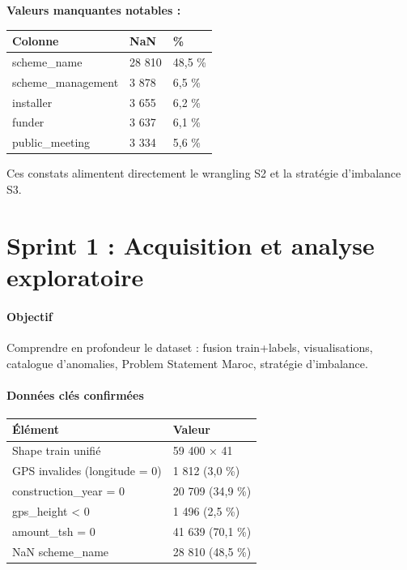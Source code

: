 \documentclass[11pt,a4paper]{report}
\begin{document}
\textbf{Valeurs manquantes notables :}



\begin{longtable}{@{}lll@{}}
\toprule
Colonne & NaN & \% \\
\midrule
scheme\_name & 28 810 & 48,5 \% \\
scheme\_management & 3 878 & 6,5 \% \\
installer & 3 655 & 6,2 \% \\
funder & 3 637 & 6,1 \% \\
public\_meeting & 3 334 & 5,6 \% \\
\bottomrule
\end{longtable}




Ces constats alimentent directement le wrangling S2 et la stratégie d'imbalance S3.





\chapter{Sprint 1 : Acquisition et analyse exploratoire}



\subsubsection{Objectif}



Comprendre en profondeur le dataset : fusion train+labels, visualisations, catalogue d'anomalies, Problem Statement Maroc, stratégie d'imbalance.



\subsubsection{Données clés confirmées}



\begin{longtable}{@{}ll@{}}
\toprule
Élément & Valeur \\
\midrule
Shape train unifié & 59 400 × 41 \\
GPS invalides (longitude = 0) & 1 812 (3,0 \%) \\
construction\_year = 0 & 20 709 (34,9 \%) \\
gps\_height < 0 & 1 496 (2,5 \%) \\
amount\_tsh = 0 & 41 639 (70,1 \%) \\
NaN scheme\_name & 28 810 (48,5 \%) \\
\bottomrule
\end{longtable}
\end{document}
